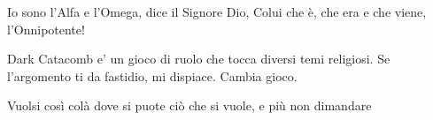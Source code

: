 \documentclass[12pt,a4paper,twoside,openany]{book}
\begin{document}

\pagebreak

{\LARGE \begin{center}
		Io sono l'Alfa e l'Omega, dice il Signore Dio, Colui che è, che era e che viene, l'Onnipotente!
\end{center}}

\vspace{15cm}

Dark Catacomb e' un gioco di ruolo che tocca diversi temi religiosi. Se l'argomento ti da fastidio, mi dispiace. Cambia gioco.

\pagebreak

\setcounter{page}{1}

\begin{multicols}{2}
\tableofcontents{}

\end{multicols}

\vfill

\begin{changemargin}{0.3cm}{0.3cm}\begin{tcolorbox}
Vuolsi così colà dove si puote
ciò che si vuole, e più non dimandare\\
\end{tcolorbox}\end{changemargin}

\pagebreak






\end{document}
